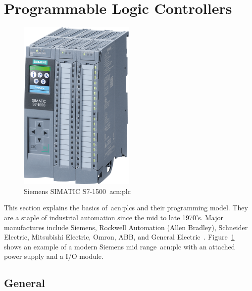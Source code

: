 \section{Programmable Logic Controllers}
\label{sec:plc}

 
\begin{figure}
    \centering
    \includegraphics[width=0.5\textwidth]{Figures/simatic_s7-1500.png}
    \caption[Siemens SIMATIC S7-1500]{Siemens SIMATIC S7-1500~\acrshort{acn:plc}~\cite{Reichelt:2020}}
    \label{fig:simatic_s7}
\end{figure}

This section explains the basics of~\glspl{acn:plc} and their programming model.
They are a staple of industrial automation since the mid to late 1970's.
Major manufactures include Siemens, Rockwell Automation (Allen Bradley), Schneider Electric, Mitsubishi Electric, Omron, ABB, and General Electric~\cite{Businesswire:2016}.
Figure~\ref{fig:simatic_s7} shows an example of a modern Siemens mid range~\acrshort{acn:plc} with an attached power supply and a I/O module.

\subsection{General}

